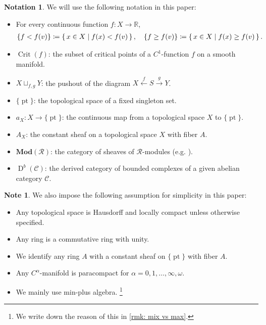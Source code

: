 \documentclass[a4paper,dvipdfmx,reqno,12pt]{amsart}
\theoremstyle{definition}
\newtheorem{Note}[theorem]{Note}
\newtheorem{Not}[theorem]{Notation}
\newcommand{\deq}{\coloneqq}
\newcommand{\opn}[1]{\operatorname{#1}}
\newcommand{\catn}[1]{\mathbf{#1}}
\newcommand{\xto}[1]{\xrightarrow{#1}}
\newcommand{\xgets}[1]{\xleftarrow{#1}}
\newcommand{\myfootnote}[1]{\hspace{-5pt}\footnote{#1}}
\numberwithin{equation}{section}
\begin{document}
\begin{Not}

We will use the following notation in this paper:

\begin{itemize}
\item For every continuous function $f\colon X\to {\mathbb{R}}$,
\begin{align*}
\{f<f(v)\}\deq \set{x\in X\mid f(x)< f(v)},\quad
\{f\geq f(v)\}\deq \set{x\in X\mid f(x)\geq f(v)}.
\end{align*}
\item $\opn{Crit}(f)$: the subset of critical points of
a $C^{1}$-function $f$ on a smooth manifold.
\item   $X\sqcup_{f,g}Y$: the pushout of the diagram
  $X\xgets{f} S\xto{g} Y$.
\item $\{\opn{pt}\}$: the topological space of 
a fixed singleton set.
\item $a_X\colon X\to \{\opn{pt}\}$:
the continuous map from a topological space $X$ to
$\{\opn{pt}\}$.
\item $A_X$: the constant sheaf on a topological space $X$ 
with fiber $A$.
\item $\catn{Mod}(\mathcal{R})$: the category of 
sheaves of $\mathcal{R}$-modules
(e.g. \cite[Definition 2.2.6]{MR1299726}).
\item $\opn{D}^{b}(\mathcal{C})$: the derived category
of bounded complexes of a given abelian category 
$\mathcal{C}$.
\end{itemize}

\end{Not}

\begin{Note}
We also impose the following assumption for simplicity in this paper:
\begin{itemize}
\item Any topological space is Hausdorff and
locally compact unless otherwise specified.
\item Any ring is a commutative ring with unity.
\item We identify any ring $A$ with a constant sheaf on
$\{\opn{pt}\}$ with fiber $A$.
\item Any $C^{\alpha}$-manifold is paracompact for 
$\alpha=0,1,\ldots,\infty,\omega$.
\item We mainly use min-plus algebra.
\myfootnote{We write down the reason of this in 
\cref{rmk: mix vs max}.}
\end{itemize}



\end{Note}
\end{document}
